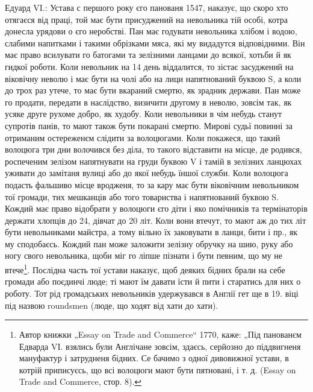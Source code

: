 Едуард VI.: Устава с першого року єго панованя 1547, наказує, що скоро хто
отягаєся від праці, той має бути присуджений на невольника тій особі, котра
донесла урядови о єго неробстві. Пан має годувати невольника хлібом і водою,
слабими напитками і такими обрізками мяса, які му видадутся відповідними. Він
має право всилувати го батогами 
та зелізними ланцами до всякої, хотьби й як гидкої роботи. Коли невольник на 14
день віддалится, то зістає засуджений на віковічну неволю і має бути на чолі
або на лици напятнований буквою S, а коли до трох раз утече, то має бути
вкараний смертю, як зрадник держави. Пан може го продати, передати в наслідство,
визичити другому в неволю, зовсім так, як усяке друге рухоме добро, як худобу.
Коли невольники в чім небудь станут супротів панів, то мают також бути покарані
смертю. Мирові судьї повинні за отриманим остереженєм слідити за волоцюгами.
Коли покажеся, що такий волоцюга три дни волочився без діла, то такого
відставити на місце, де родився, роспеченим зелізом напятнувати на груди буквою
V і тамій в зелізних ланцюхах уживати до замітаня вулиці або до якої небудь
їншої служби. Коли волоцюга подасть фальшиво місце вродженя, то за кару має
бути віковічним невольником тої громади, тих мешканців або того товариства і
напятнований буквою S. Кождий має право відобрати у волоцюги єго діти і яко
помічників та термінаторів держати хлопців до 24, дівчат до 20 літ. Коли вони
втечут, то мают аж до тих літ бути невольниками майстра, а тому вільно їх
заковувати в ланци, бити і пр., як му сподобаєсь. Кождий пан може заложити
зелізну обручку на шию, руку або ногу свого невольника, щоби міг го ліпше
пізнати і бути певним, що му не втече\footnote{
Автор книжки „Essay on Trade and Commerce“ 1770, каже: „Під панованєм Едварда
VI. взялись були Англічане зовсім, здаєсь, серйозно до піддвигненя мануфактур і
затрудненя бідних. Се бачимо з одної дивовижної устави, в котрій приписуєсь, що
всі волоцюги мают бути пятновані, і т. д. (Essay on Trade and Commerce, стор.
8).
}. Послідна часть тої устави наказує, щоб
деяких бідних брали на себе громади або поєдинчі люде; ті мают їм давати їсти
й пити і старатись для них о роботу. Тот рід громадських невольників удержувався
в Англії гет ще в 19. віці під назвою roundsmen (люде, що ходят від хати до
хати).

